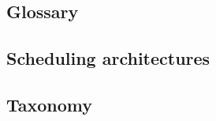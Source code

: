 

\subsection{Glossary}


\subsection{Scheduling architectures} \label{rm_architectures}


\subsection{Taxonomy} \label{rm_taxonomy}
